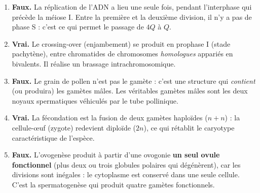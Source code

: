 \documentclass[11pt]{article}
\newcommand{\cle}[1]{{\popxbold\color{popdark}#1}}
\begin{document}
\begin{corrige}
\begin{enumerate}
\item \textbf{Faux.} La réplication de l'ADN a lieu une seule fois, pendant l'interphase qui précède la méiose I. Entre la première et la deuxième division, il n'y a pas de phase S : c'est ce qui permet le passage de $4Q$ à $Q$.
\item \textbf{Vrai.} Le \cle{crossing-over} (enjambement) se produit en prophase I (stade pachytène), entre chromatides de chromosomes \emph{homologues} appariés en bivalents. Il réalise un brassage intrachromosomique.
\item \textbf{Faux.} Le grain de pollen n'est pas le gamète : c'est une structure qui \emph{contient} (ou produira) les gamètes mâles. Les véritables gamètes mâles sont les deux noyaux spermatiques véhiculés par le tube pollinique.
\item \textbf{Vrai.} La fécondation est la fusion de deux gamètes haploïdes ($n + n$) : la cellule-\oe uf (zygote) redevient diploïde ($2n$), ce qui rétablit le caryotype caractéristique de l'espèce.
\item \textbf{Faux.} L'ovogenèse produit à partir d'une ovogonie \textbf{un seul ovule fonctionnel} (plus deux ou trois globules polaires qui dégénèrent), car les divisions sont inégales : le cytoplasme est conservé dans une seule cellule. C'est la spermatogenèse qui produit quatre gamètes fonctionnels.
\end{enumerate}
\end{corrige}
\end{document}
